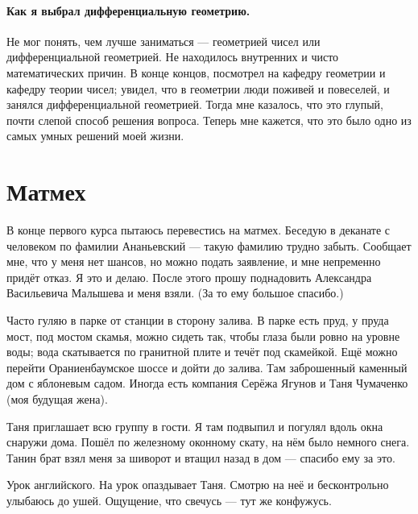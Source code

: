 \documentclass{book}
\begin{document}
\paragraph{Как я выбрал дифференциальную геометрию.}
Не мог понять, чем лучше заниматься --- геометрией чисел или дифференциальной геометрией.
Не находилось внутренних и чисто математических причин.
В конце концов, посмотрел на кафедру геометрии и кафедру теории чисел;
увидел, что в геометрии люди поживей и повеселей, и занялся дифференциальной геометрией.
Тогда мне казалось, что это глупый, почти слепой способ решения вопроса.
Теперь мне кажется, что это было одно из самых умных решений моей жизни.


\section*{Матмех}

В конце первого курса пытаюсь перевестись на матмех.
Беседую в деканате с человеком по фамилии Ананьевский ---
такую фамилию трудно забыть.
Сообщает мне,
что у меня нет шансов,
но можно подать заявление, и мне непременно придёт отказ.
Я это и делаю.
После этого прошу поднадовить Александра Васильевича Малышева и меня взяли.
(За то ему большое спасибо.)

Часто гуляю в парке от станции в сторону залива.
В парке есть пруд, у пруда мост, под мостом скамья, 
можно сидеть так, чтобы глаза были ровно на уровне воды;
вода скатывается по гранитной плите и течёт под скамейкой.
Ещё можно перейти Ораниенбаумское шоссе и дойти до залива.
Там заброшенный каменный дом с яблоневым садом.
Иногда есть компания Серёжа Ягунов и Таня Чумаченко (моя будущая жена).

Таня приглашает всю группу в гости.
Я там подвыпил и погулял вдоль окна снаружи дома.
Пошёл по железному оконному скату, 
на нём было немного снега.
Танин брат взял меня за шиворот и втащил назад в дом --- спасибо ему за это.

Урок английского.
На урок опаздывает Таня.
Смотрю на неё и бесконтрольно улыбаюсь до ушей.
Ощущение, что свечусь --- тут же конфужусь.
\end{document}
